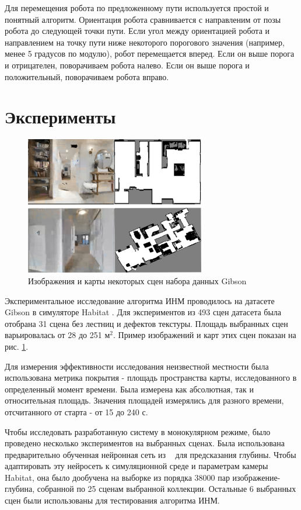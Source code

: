 \documentclass{mipt-thesis-ms}
\begin{document}
	Для перемещения робота по предложенному пути используется простой и понятный алгоритм. Ориентация робота сравнивается с направленим от позы робота до следующей точки пути. Если угол между ориентацией робота и направлением на точку пути ниже некоторого порогового значения (например, менее 5 градусов по модулю), робот перемещается вперед. Если он выше порога и отрицателен, поворачиваем робота налево. Если он выше порога и положительный, поворачиваем робота вправо.
	
	\section{Эксперименты}
	
	\begin{figure}
		\centering
		\includegraphics[width=0.7\textwidth]{img/gibson_sample_with_map.png}
		\caption{Изображения и карты некоторых сцен набора данных Gibson}
		\label{figure_gibson_env}
	\end{figure}
	
	Экспериментальное исследование алгоритма ИНМ проводилось на датасете Gibson \cite{xia2018gibson} в симуляторе Habitat \cite{savva2019habitat}. Для экспериментов из 493 сцен датасета была отобрана 31 сцена без лестниц и дефектов текстуры. Площадь выбранных сцен варьировалась от 28 до 251 $\text{м}^2$. Пример изображений и карт этих сцен показан на рис. \ref{figure_gibson_env}.
	
	Для измерения эффективности исследования неизвестной местности была использована метрика покрытия - площадь пространства карты, исследованного в определенный момент времени. Была измерена как абсолютная, так и относительная площадь. Значения площадей измерялись для разного времени, отсчитанного от старта - от 15 до 240 с.
	
	Чтобы исследовать разработанную систему в монокулярном режиме, было проведено несколько экспериментов на выбранных сценах. Была использована предварительно обученная нейронная сеть из ~\cite{bokovoy2019real} для предсказания глубины. Чтобы адаптировать эту нейросеть к симуляционной среде и параметрам камеры Habitat, она было дообучена на выборке из порядка 38000 пар изображение-глубина, собранной по 25 сценам выбранной коллекции. Остальные 6 выбранных сцен были использованы для тестирования алгоритма ИНМ.
	
\end{document}
